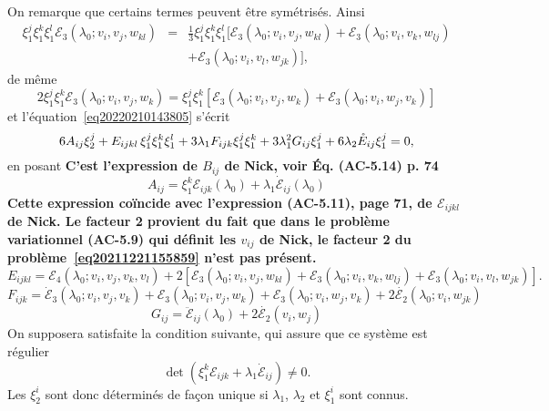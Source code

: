 \documentclass[12pt, final]{amsart}
\begin{document}
On remarque que certains termes peuvent {\^e}tre sym{\'e}tris{\'e}s. Ainsi
\begin{eqnarray}
  \xi_1^j \xi_1^k \xi_1^l \mathcal{E}_3 (\lambda_0 ; v_i, v_j, w_{k
  l}) & = & \tfrac{1}{3} \xi_1^j \xi_1^k \xi_1^l  [\mathcal{E}_3 (\lambda_0 ;
  v_i, v_j, w_{k  l})  +\mathcal{E}_3 (\lambda_0 ; v_i, v_k,
  w_{l  j}) \nonumber\\
  &  &   +\mathcal{E}_3 (\lambda_0 ; v_i, v_l, w_{j
   k})],
\end{eqnarray}
de m{\^e}me
\begin{equation}
  2 \xi_1^j \xi_1^k \mathcal{E}_3 (\lambda_0 ; v_i, v_j, w_k) = \xi_1^j
  \xi_1^k  [\mathcal{E}_3 (\lambda_0 ; v_i, v_j, w_k) +\mathcal{E}_3
  (\lambda_0 ; v_i, w_j, v_k)]
\end{equation}
et l'{\'e}quation~\eqref{eq20220210143805} s'{\'e}crit
\begin{equation}
  \label{eq20220216141706} 6 A_{i  j} \xi_2^j + E_{i  j
   k  l}  \hspace{0.17em} \xi_1^j \xi_1^k \xi_1^l + 3
  \lambda_1 F_{i  j  k} \xi_1^j \xi_1^k + 3 \lambda_1^2 G_{i
   j} \xi_1^j + 6 \lambda_2  \mathring{E}_{i  j} \xi_1^j = 0,
\end{equation}
en posant \textbf{C'est l'expression de $B_{ij}$ de Nick, voir {\'E}q.
(AC-5.14) p. 74}
\begin{equation}
  A_{i  j} = \xi_1^k \mathcal{E}_{i  j  k} (\lambda_0)
  + \lambda_1  \dot{\mathcal{E}}_{i  j} (\lambda_0)
\end{equation}
\textbf{Cette expression co{\"i}ncide avec l'expression (AC-5.11), page 71,
de $\mathcal{E}_{i  j  k  l}$ de Nick. Le facteur 2
provient du fait que dans le probl{\`e}me variationnel (AC-5.9) qui
d{\'e}finit les $v_{i  j}$ de Nick, le facteur 2 du
probl{\`e}me~\eqref{eq20211221155859} n'est pas pr{\'e}sent.}
\begin{equation}
  E_{i  j  k  l} =\mathcal{E}_4  (\lambda_0 ; v_i,
  v_j, v_k, v_l) + 2 [\mathcal{E}_3 (\lambda_0 ; v_i, v_j, w_{k  l})
  +\mathcal{E}_3 (\lambda_0 ; v_i, v_k, w_{l  j}) +\mathcal{E}_3
  (\lambda_0 ; v_i, v_l, w_{j  k})] .
\end{equation}
\begin{equation}
  F_{i  j  k} = \dot{\mathcal{E}}_3  (\lambda_0 ; v_i, v_j,
  v_k) +\mathcal{E}_3  (\lambda_0 ; v_i, v_j, w_k) +\mathcal{E}_3  (\lambda_0
  ; v_i, w_j, v_k) + 2 \dot{\mathcal{E}_2} (\lambda_0 ; v_i, w_{j  k})
\end{equation}
\begin{equation}
  G_{i  j} = \ddot{\mathcal{E}}_{i  j} (\lambda_0) + 2
  \dot{\mathcal{E}_2} (v_i, w_j)
\end{equation}
On supposera satisfaite la condition suivante, qui assure que ce syst{\`e}me
est r{\'e}gulier
\begin{equation}
  \det (\xi_1^k \mathcal{E}_{i  j  k} + \lambda_1
  \dot{\mathcal{E}}_{i  j}) \neq 0.
\end{equation}
Les $\xi_2^i$ sont donc d{\'e}termin{\'e}s de fa{\c c}on unique si
$\lambda_1$, $\lambda_2$ et $\xi_1^i$ sont connus.
\end{document}
